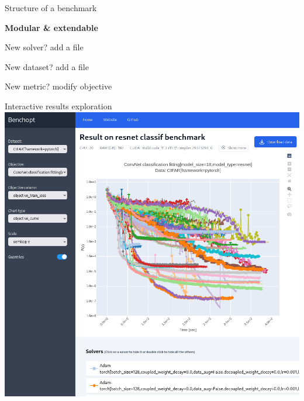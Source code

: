 \documentclass[unknownkeysallowed]{beamer}
\begin{document}
\begin{frame}{Structure of a benchmark}

    \begin{minipage}{0.45\linewidth}
    \end{minipage}
    \begin{minipage}{0.45\linewidth}

    \textbf{Modular \& extendable}
    \vspace*{5mm}

    New solver? add a file

    New dataset? add a file

    New metric? modify objective
    \end{minipage}

\end{frame}

\begin{frame}{Interactive results exploration}
    \centering
    \includegraphics[width=0.8\linewidth]{sharedimages/benchopt_convnet.png}
\end{frame}
\end{document}
